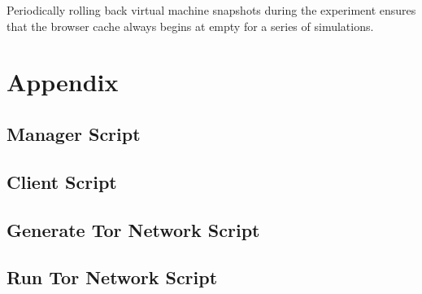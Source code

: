 \documentclass{ecuthesis}
\begin{document}
Periodically rolling back virtual machine snapshots during the experiment
ensures that the browser cache always begins at empty for a series of
simulations.





\chapter{Appendix}

\section{Manager Script}

\label{manager-script}


\section{Client Script}

\label{client-script}


\section{Generate Tor Network Script}

\label{generate-tor-network-script}


\section{Run Tor Network Script}

\label{run-tor-network-script}


\printbibliography[title=REFERENCES]
\end{document}
